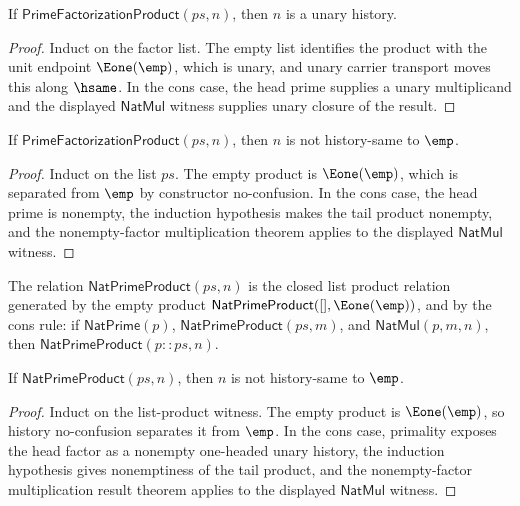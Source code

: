 \begin{theorem}
\label{thm:prime-factorization-product-result-unary}
If \(\mathsf{PrimeFactorizationProduct}(ps,n)\), then \(n\) is a unary
history.
\end{theorem}
\begin{proof}
Induct on the factor list. The empty list identifies the product with the
unit endpoint \(\Eone(\emp)\), which is unary, and unary carrier transport
moves this along \(\hsame\). In the cons case, the head prime supplies a unary
multiplicand and the displayed \(\mathsf{NatMul}\) witness supplies unary
closure of the result.
\end{proof}

\begin{theorem}
\label{thm:prime-factorization-product-result-not-empty}
If \(\mathsf{PrimeFactorizationProduct}(ps,n)\), then \(n\) is not
history-same to \(\emp\).
\end{theorem}
\begin{proof}
Induct on the list \(ps\). The empty product is \(\Eone(\emp)\), which is
separated from \(\emp\) by constructor no-confusion. In the cons case, the
head prime is nonempty, the induction hypothesis makes the tail product
nonempty, and the nonempty-factor multiplication theorem applies to the
displayed \(\mathsf{NatMul}\) witness.
\end{proof}

\begin{definition}
\label{def:nat-prime-product-relation}
The relation \(\mathsf{NatPrimeProduct}(ps,n)\) is the closed list product
relation generated by the empty product
\(\mathsf{NatPrimeProduct}([], \Eone(\emp))\), and by the cons rule: if
\(\mathsf{NatPrime}(p)\), \(\mathsf{NatPrimeProduct}(ps,m)\), and
\(\mathsf{NatMul}(p,m,n)\), then
\(\mathsf{NatPrimeProduct}(p::ps,n)\).
\end{definition}

\begin{theorem}
\label{thm:nat-prime-product-result-not-empty}
If \(\mathsf{NatPrimeProduct}(ps,n)\), then \(n\) is not history-same to
\(\emp\).
\end{theorem}
\begin{proof}
Induct on the list-product witness. The empty product is \(\Eone(\emp)\), so
history no-confusion separates it from \(\emp\). In the cons case, primality
exposes the head factor as a nonempty one-headed unary history, the induction
hypothesis gives nonemptiness of the tail product, and the nonempty-factor
multiplication result theorem applies to the displayed \(\mathsf{NatMul}\)
witness.
\end{proof}

